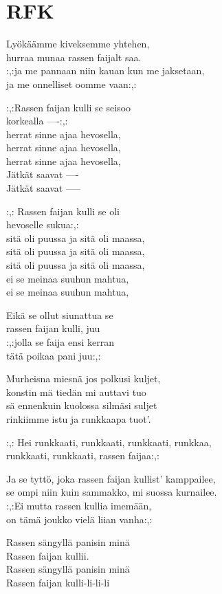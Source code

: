 \section{RFK}
Lyökäämme kiveksemme yhtehen,\\
hurraa munaa rassen faijalt saa.\\
:,:ja me pannaan niin kauan kun me jaksetaan,\\
ja me onnelliset oomme vaan:,:

:,:Rassen faijan kulli se seisoo\\
korkealla ----:,:\\
herrat sinne ajaa hevosella,\\
herrat sinne ajaa hevosella,\\
herrat sinne ajaa hevosella,\\
Jätkät saavat ----\\
Jätkät saavat -----

:,: Rassen faijan kulli se oli\\
hevoselle sukua:,:\\
sitä oli puussa ja sitä oli maassa,\\
sitä oli puussa ja sitä oli maassa,\\
sitä oli puussa ja sitä oli maassa,\\
ei se meinaa suuhun mahtua,\\
ei se meinaa suuhun mahtua,

Eikä se ollut siunattua se\\
rassen faijan kulli, juu\\
:,:jolla se faija ensi kerran\\
tätä poikaa pani juu:,:

Murheisna miesnä jos polkusi kuljet,\\
konstin mä tiedän mi auttavi tuo\\
sä ennenkuin kuolossa silmäsi suljet\\
rinkiimme istu ja runkkaapa tuot'.

:,: Hei runkkaati, runkkaati, runkkaati, runkkaa,\\
runkkaati, runkkaati, rassen faijaa:,:

Ja se tyttö, joka rassen faijan kullist' kamppailee,\\
se ompi niin kuin sammakko, mi suossa kurnailee.\\
:,:Ei mutta rassen kullia imemään,\\
on tämä joukko vielä liian vanha:,:

Rassen sängyllä panisin minä\\
Rassen faijan kullii.\\
Rassen sängyllä panisin minä\\
Rassen faijan kulli-li-li-li

